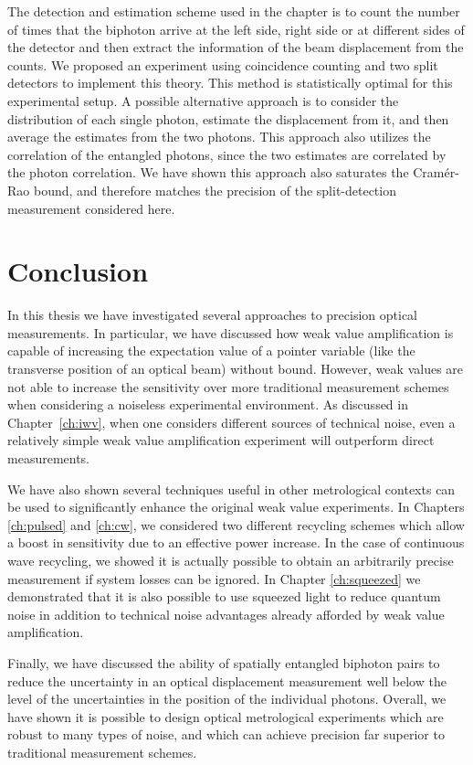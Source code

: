 The detection and estimation scheme used in the chapter is to count the number of times that the biphoton arrive at the left side, right side or at different sides of the detector and then extract the information of the beam displacement from the counts. We proposed an experiment using coincidence counting and two split detectors to implement this theory. This method is statistically optimal for this experimental setup.  A possible alternative approach is to consider the distribution of each single photon, estimate the displacement from it, and then average the estimates from the two photons. This approach also utilizes the correlation of the entangled photons, since the two estimates are correlated by the photon correlation.  We have shown this approach also saturates the Cram\'{e}r-Rao bound, and therefore matches the precision of the split-detection measurement considered here.

\chapter{Conclusion}
In this thesis we have investigated several approaches to precision optical measurements.  In particular, we have discussed how weak value amplification is capable of increasing the expectation value of a pointer variable (like the transverse position of an optical beam) without bound.  However, weak values are not able to increase the sensitivity over more traditional measurement schemes when considering a noiseless experimental environment.  As discussed in Chapter~\ref{ch:iwv}, when one considers different sources of technical noise, even a relatively simple weak value amplification experiment will outperform direct measurements.

We have also shown several techniques useful in other metrological contexts can be used to significantly enhance the original weak value experiments.  In Chapters \ref{ch:pulsed} and \ref{ch:cw}, we considered two different recycling schemes which allow a boost in sensitivity due to an effective power increase.  In the case of continuous wave recycling, we showed it is actually possible to obtain an arbitrarily precise measurement if system losses can be ignored.  In Chapter \ref{ch:squeezed} we demonstrated that it is also possible to use squeezed light to reduce quantum noise in addition to technical noise advantages already afforded by weak value amplification.

Finally, we have discussed the ability of spatially entangled biphoton pairs to reduce the uncertainty in an optical displacement measurement well below the level of the uncertainties in the position of the individual photons.  Overall, we have shown it is possible to design optical metrological experiments which are robust to many types of noise, and which can achieve precision far superior to traditional measurement schemes. 


